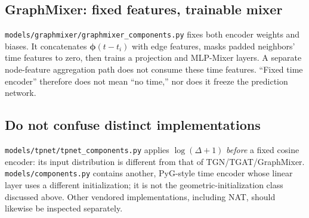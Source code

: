 \documentclass[11pt]{article}
\begin{document}
\subsection{GraphMixer: fixed features, trainable mixer}
\texttt{models/graphmixer/graphmixer\_components.py} fixes both encoder weights and biases. It concatenates $\boldsymbol{\phi}(t-t_i)$ with edge features, masks padded neighbors' time features to zero, then trains a projection and MLP-Mixer layers. A separate node-feature aggregation path does not consume these time features. ``Fixed time encoder'' therefore does not mean ``no time,'' nor does it freeze the prediction network.

\subsection{Do not confuse distinct implementations}
\texttt{models/tpnet/tpnet\_components.py} applies $\log(\Delta+1)$ \emph{before} a fixed cosine encoder: its input distribution is different from that of TGN/TGAT/GraphMixer. \texttt{models/components.py} contains another, PyG-style time encoder whose linear layer uses a different initialization; it is not the geometric-initialization class discussed above. Other vendored implementations, including NAT, should likewise be inspected separately.
\end{document}
